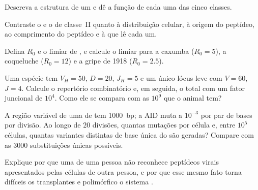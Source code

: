 \begin{exercise}[$\star$]\label{exo:b3:adaptive-immunity:2}
Descreva a estrutura de um  e dê a função de cada uma das
cinco classes.
\end{exercise}

\begin{exercise}[$\star$]\label{exo:b3:adaptive-immunity:3}
Contraste o  e o de classe~II quanto à distribuição
celular, à origem do peptídeo, ao comprimento do peptídeo e à 
que lê cada um.
\end{exercise}

\begin{exercise}[$\star$]\label{exo:b3:adaptive-immunity:4}
Defina $R_{0}$ e o limiar de , e calcule o limiar
para a caxumba ($R_{0} = 5$), a coqueluche ($R_{0} = 12$) e a gripe de
1918 ($R_{0} = 2.5$).
\end{exercise}

\begin{exercise}[$\star\star$]\label{exo:b3:adaptive-immunity:5}
Uma espécie tem $V_{H} = 50$, $D = 20$, $J_{H} = 5$ e um único lócus
leve com $V = 60$, $J = 4$. Calcule o repertório combinatório e, em
seguida, o total com um fator juncional de $10^{4}$. Como ele se compara
com as $10^{9}$  que o animal tem?
\end{exercise}

\begin{exercise}[$\star\star$]\label{exo:b3:adaptive-immunity:6}
A região variável de uma  de  tem
\qty{1000}{bp}; a AID muta a $10^{-3}$ por par de bases por divisão. Ao
longo de $20$ divisões, quantas mutações por célula e, entre $10^{5}$
células, quantas variantes distintas de base única do  são
geradas? Compare com as $3000$ substituições únicas possíveis.
\end{exercise}

\begin{exercise}[$\star\star$]\label{exo:b3:adaptive-immunity:7}
Explique por que uma  de uma pessoa não reconhece peptídeos
virais apresentados pelas células de outra pessoa, e por que esse mesmo
fato torna difíceis os transplantes e polimórfico o sistema .
\end{exercise}

